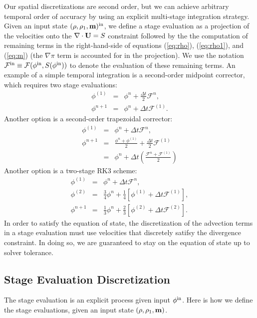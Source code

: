 \documentclass[final]{siamltex}
\def\mb {{\bf m}}
\def\Ub {{\bf U}}
\begin{document}
Our spatial discretizations are second order, but we can achieve arbitrary temporal order of
accuracy by using an explicit multi-stage integration strategy.  Given an input 
state $(\rho,\rho_1,\mb)^{\rm in}$, we define a stage evaluation as a projection
of the velocities onto the $\nabla\cdot\Ub=S$ constraint followed by the the 
computation of remaining terms in the
right-hand-side of equations (\ref{eq:rho}), (\ref{eq:rho1}), and (\ref{eq:m}) (the
$\nabla\pi$ term is accounted for in the projection).
We use the notation
$\mathcal{F}^{\rm in} \equiv \mathcal{F}(\phi^{\rm in},S(\phi^{\rm in}))$ 
to denote the evaluation of these remaining terms.  An
example of a simple temporal integration is a second-order midpoint corrector, which 
requires two stage evaluations:
\begin{eqnarray}
\phi^{(1)} &=& \phi^n + \frac{\Delta t}{2}\mathcal{F}^n,\\
\phi^{n+1} &=& \phi^n + \Delta t\mathcal{F}^{(1)}.
\end{eqnarray}
Another option is a second-order trapezoidal corrector:
\begin{eqnarray}
\phi^{(1)} &=& \phi^n + \Delta t\mathcal{F}^n,\\
\phi^{n+1} &=& \frac{\phi^n + \phi^{(1)}}{2} + \frac{\Delta t}{2}\mathcal{F}^{(1)}\nonumber\\
&=& \phi^n + \Delta t\left(\frac{\mathcal{F}^n+\mathcal{F}^{(1)}}{2}\right)
\end{eqnarray}
Another option is a two-stage RK3 scheme:
\begin{eqnarray}
\phi^{(1)} &=& \phi^n + \Delta t\mathcal{F}^n,\\
\phi^{(2)} &=& \frac{3}{4}\phi^n + \frac{1}{4}\left[\phi^{(1)} + \Delta t\mathcal{F}^{(1)}\right],\\
\phi^{n+1} &=& \frac{1}{3}\phi^n + \frac{2}{3}\left[\phi^{(2)} + \Delta t\mathcal{F}^{(2)}\right].
\end{eqnarray}
In order to satisfy the equation of state, the discretization of the advection terms
in a stage evaluation must use velocities that discretely satifsy the divergence constraint.
In doing so, we are guaranteed to stay on the equation of state up to solver tolerance.

\subsection{Stage Evaluation Discretization}
The stage evaluation is an explicit process given input $\phi^{\rm in}$.  Here is how we 
define the stage evaluations, given an input state $(\rho,\rho_1,\mb)$.\\
\end{document}
